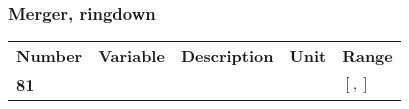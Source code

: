 \documentclass[12pt]{article}
\begin{document}
\subsubsection{Merger, ringdown}
\begin{tabular}{lllll}
  \textbf{Number} & \textbf{Variable} & \textbf{Description} & \textbf{Unit} & \textbf{Range} \\
  \textbf{81} &   & & & $[,]$ \\
\end{tabular}

\end{document}
